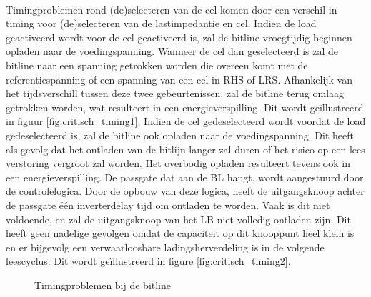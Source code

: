 \paragraph{}
Timingproblemen rond (de)selecteren van de cel komen door een verschil in timing voor (de)selecteren van de lastimpedantie en cel. Indien de load geactiveerd wordt voor de cel geactiveerd is, zal de bitline vroegtijdig beginnen opladen naar de voedingspanning. Wanneer de cel dan geselecteerd is zal de bitline naar een spanning getrokken worden die overeen komt met de referentiespanning of een spanning van een cel in RHS of LRS. Afhankelijk van het tijdsverschill tussen deze twee gebeurtenissen, zal de bitline terug omlaag getrokken worden, wat resulteert in een energieverspilling. Dit wordt geïllustreerd in figuur \ref{fig:critisch_timing1}. Indien de cel gedeselecteerd wordt voordat de load gedeselecteerd is, zal de bitline ook opladen naar de voedingspanning. Dit heeft als gevolg dat het ontladen van de bitlijn langer zal duren of het risico op een lees verstoring vergroot zal worden. Het overbodig opladen resulteert tevens ook in een energieverspilling. De passgate dat aan de BL hangt, wordt aangestuurd door de controlelogica. Door de opbouw van deze logica, heeft de uitgangsknoop achter de passgate één inverterdelay tijd om ontladen te worden. Vaak is dit niet voldoende, en zal de uitgangsknoop van het LB niet volledig ontladen zijn. Dit heeft geen nadelige gevolgen omdat de capaciteit op dit knooppunt heel klein is en er bijgevolg een verwaarloosbare ladingsherverdeling is in de volgende leescyclus. Dit wordt geïllustreerd in figure \ref{fig:critisch_timing2}.  


\begin{figure}[ht]
\centering
{}
\caption[Timingproblemen bij de bitline]{Timingproblemen bij de bitline}
\clearpage
\end{figure}

